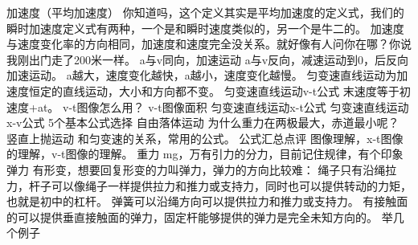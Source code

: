 {}加速度（平均加速度）\markdownRendererParagraphSeparator
{}你知道吗，这个定义其实是平均加速度的定义式，我们的瞬时加速度定义式有两种，一个是和瞬时速度类似的，另一个是牛二的。\markdownRendererParagraphSeparator
{}加速度与速度变化率的方向相同，加速度和速度完全没关系。就好像有人问你在哪？你说我刚出门走了200米一样。\markdownRendererParagraphSeparator
{}a与v同向，加速运动\markdownRendererSoftLineBreak
{}a与v反向，减速运动到0，后反向加速运动。\markdownRendererSoftLineBreak
{}a越大，速度变化越快，a越小，速度变化越慢。\markdownRendererParagraphSeparator
{}匀变速直线运动为加速度恒定的直线运动，大小和方向都不变。\markdownRendererParagraphSeparator
{}匀变速直线运动v-t公式\markdownRendererSoftLineBreak
{}末速度等于初速度+at。\markdownRendererInterblockSeparator
{}
\markdownRendererSectionEnd \markdownRendererSectionBegin
{}\markdownRendererInterblockSeparator
{}v-t图像怎么用？\markdownRendererParagraphSeparator
{}v-t图像面积\markdownRendererParagraphSeparator
{}匀变速直线运动x-t公式\markdownRendererParagraphSeparator
{}匀变速直线运动x-v公式\markdownRendererInterblockSeparator
{}
\markdownRendererSectionEnd \markdownRendererSectionBegin
{}\markdownRendererInterblockSeparator
{}5个基本公式选择\markdownRendererParagraphSeparator
{}自由落体运动 为什么重力在两极最大，赤道最小呢？\markdownRendererParagraphSeparator
{}竖直上抛运动 和匀变速的关系，常用的公式。\markdownRendererInterblockSeparator
{}
\markdownRendererSectionEnd \markdownRendererSectionBegin
{}\markdownRendererInterblockSeparator
{}公式汇总点评\markdownRendererParagraphSeparator
{}图像理解，x-t图像的理解，v-t图像的理解。\markdownRendererInterblockSeparator
{}
\markdownRendererSectionEnd \markdownRendererSectionBegin
{}\markdownRendererInterblockSeparator
{}重力 mg，万有引力的分力，目前记住规律，有个印象\markdownRendererParagraphSeparator
{}弹力 有形变，想要回复形变的力叫弹力，弹力的方向比较难：\markdownRendererSoftLineBreak
{}绳子只有沿绳拉力，杆子可以像绳子一样提供拉力和推力或支持力，同时也可以提供转动的力矩，也就是初中的杠杆。\markdownRendererSoftLineBreak
{}弹簧可以沿绳方向可以提供拉力和推力或支持力。\markdownRendererSoftLineBreak
{}有接触面的可以提供垂直接触面的弹力，固定杆能够提供的弹力是完全未知方向的。\markdownRendererSoftLineBreak
{}举几个例子\markdownRendererInterblockSeparator
{}
\markdownRendererSectionEnd \markdownRendererSectionBegin
{}\markdownRendererInterblockSeparator

